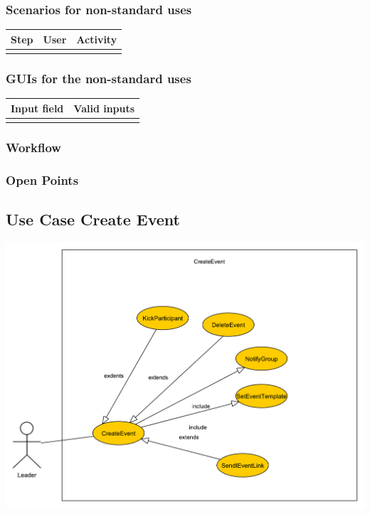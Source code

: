 \documentclass[12pt]{article}
\theoremstyle{definition}
\begin{document}
\subsubsection{Scenarios for non-standard uses}

\begin{tabular}{|l|l|l|}
\hline
Step & User & Activity \\ \hline
 & & \\ \hline
\end{tabular}

\subsubsection{GUIs for the non-standard uses}

\begin{tabular}{|l|l|}
\hline
Input field & Valid inputs \\ \hline
 &  \\ \hline
\end{tabular}

\subsubsection{Workflow}

\subsubsection{Open Points}
\subsection{Use Case Create Event}

\includegraphics[scale=.5]{CreateEvent.pdf}
\end{document}
